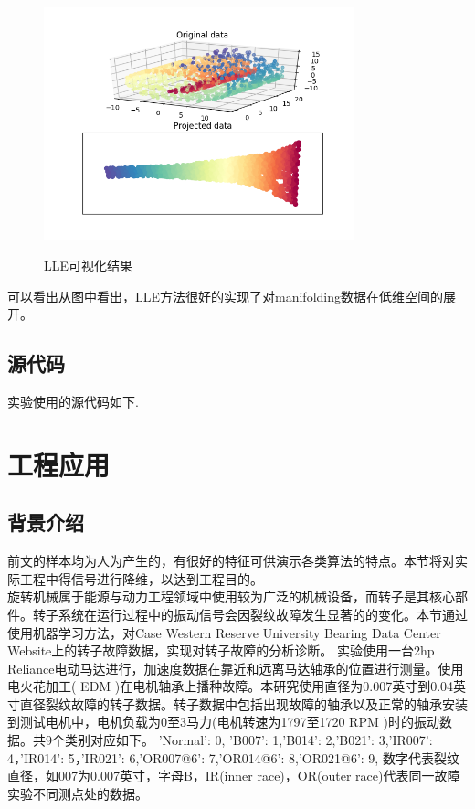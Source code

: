\documentclass[UTF8]{ctexart}
\begin{document}
	\begin{figure}[H]
	  \centering
	  \label{fig:Per3A}\includegraphics[width=0.8\textwidth]{LLE.png}\
	  \caption{LLE可视化结果}
	  \label{fig:oscil}    
	\end{figure}
	
可以看出从图中看出，LLE方法很好的实现了对manifolding数据在低维空间的展开。

\subsection{源代码}
实验使用的源代码如下.  \vspace{5mm}
	
	\vspace{3mm}




\newpage
\section{工程应用}
\subsection{背景介绍}
前文的样本均为人为产生的，有很好的特征可供演示各类算法的特点。本节将对实际工程中得信号进行降维，以达到工程目的。\\
旋转机械属于能源与动力工程领域中使用较为广泛的机械设备，而转子是其核心部件。转子系统在运行过程中的振动信号会因裂纹故障发生显著的的变化。本节通过使用机器学习方法，对Case Western Reserve University Bearing Data Center Website上的转子故障数据，实现对转子故障的分析诊断。
实验使用一台2hp Reliance电动马达进行，加速度数据在靠近和远离马达轴承的位置进行测量。使用电火花加工( EDM )在电机轴承上播种故障。本研究使用直径为0.007英寸到0.04英寸直径裂纹故障的转子数据。转子数据中包括出现故障的轴承以及正常的轴承安装到测试电机中，电机负载为0至3马力(电机转速为1797至1720 RPM )时的振动数据。共9个类别对应如下。
{'Normal': 0, 'B007': 1,'B014': 2,'B021': 3,'IR007': 4，'IR014': 5，'IR021': 6,'OR007@6': 7,'OR014@6': 8,'OR021@6': 9, }
  数字代表裂纹直径，如007为0.007英寸，字母B，IR(inner race)，OR(outer race)代表同一故障实验不同测点处的数据。
\end{document}
